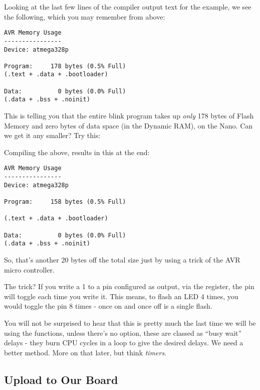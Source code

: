 Looking at the last few lines of the compiler output text for the  example, we see the following, which you may remember from above:

\begin{lstlisting}[firstnumber=14]
AVR Memory Usage
----------------
Device: atmega328p

Program:     178 bytes (0.5% Full)
(.text + .data + .bootloader)

Data:          0 bytes (0.0% Full)
(.data + .bss + .noinit)
\end{lstlisting}

This is telling you that the entire blink program takes up \emph{only}
178 bytes of Flash Memory and zero bytes of data space (in the Dynamic
RAM), on the Nano.  Can we get it any smaller? Try this:




Compiling the above, results in this at the end:

\begin{lstlisting}[firstnumber=14]
AVR Memory Usage
----------------
Device: atmega328p

Program:     158 bytes (0.5% Full)

(.text + .data + .bootloader)

Data:          0 bytes (0.0% Full)
(.data + .bss + .noinit)
\end{lstlisting}

So, that's another 20 bytes off the total size just by using a trick of the AVR micro controller.

The trick? If you write a 1 to a pin configured as output, via the  register, the pin will toggle each time you write it. This means, to flash an LED 4 times, you would toggle the pin 8 times - once on and once off is a single flash.

\begin{note}
	You will not be surprised to hear that this is pretty much the last time we will be using the  functions, unless there's no option, these are classed as ``busy wait'' delays - they burn CPU cycles in a loop to give the desired delays. We need a better method. More on that later, but think \emph{timers}.
\end{note}

\subsection{Upload to Our Board}\label{upload-to-our-board}

